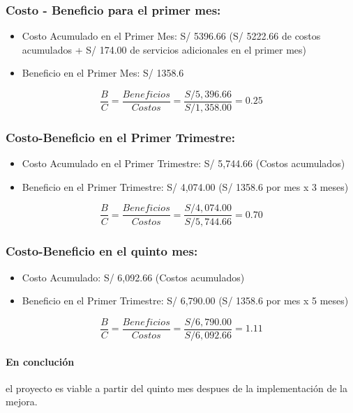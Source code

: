 \subsubsection*{Costo - Beneficio para el primer mes:}
\begin{itemize}
    \item Costo Acumulado en el Primer Mes: S/ 5396.66 (S/ 5222.66 de costos acumulados + S/ 174.00 de servicios adicionales en el primer mes)
    \item Beneficio en el Primer Mes: S/ 1358.6
\end{itemize}
\[\frac{B}{C} = \frac{Beneficios}{Costos} = \frac{S/ 5,396.66}{S/ 1,358.00} = 0.25\]


\subsubsection*{Costo-Beneficio en el Primer Trimestre:}
\begin{itemize}
    \item Costo Acumulado en el Primer Trimestre: S/ 5,744.66 (Costos acumulados)
    \item Beneficio en el Primer Trimestre: S/ 4,074.00 (S/ 1358.6 por mes x 3 meses)
\end{itemize}
\[\frac{B}{C} = \frac{Beneficios}{Costos} = \frac{S/ 4,074.00}{S/ 5,744.66} = 0.70\]

\subsubsection*{Costo-Beneficio en el quinto mes:}
\begin{itemize}
    \item Costo Acumulado: S/ 6,092.66 (Costos acumulados)
    \item Beneficio en el Primer Trimestre: S/ 6,790.00 (S/ 1358.6 por mes x 5 meses)
\end{itemize}
\[\frac{B}{C} = \frac{Beneficios}{Costos} = \frac{S/ 6,790.00}{S/ 6,092.66} = 1.11\]

\paragraph*{En conclución} el proyecto es viable a partir del quinto mes despues de la implementación de la mejora.
